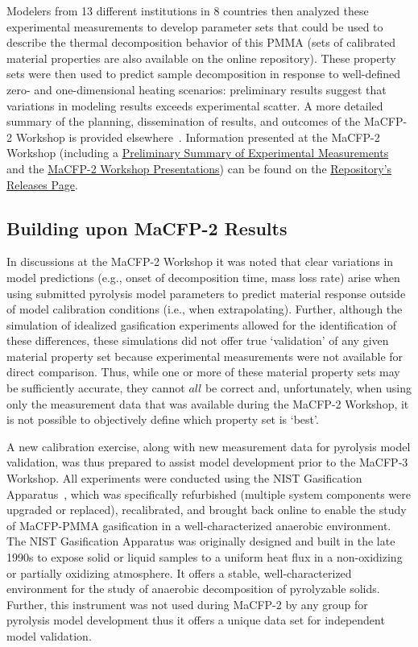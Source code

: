 \documentclass[12pt]{article}
\begin{document}
Modelers from 13 different institutions in 8 countries then analyzed these experimental measurements to develop parameter sets that could be used to describe the thermal decomposition behavior of this PMMA (sets of calibrated material properties are also available on the online repository). These property sets were then used to predict sample decomposition in response to well-defined zero- and one-dimensional heating scenarios: preliminary results suggest that variations in modeling results exceeds experimental scatter.  A more detailed summary of the planning, dissemination of results, and outcomes of the MaCFP-2 Workshop is provided elsewhere~\cite{Leventon2022ASTM}. Information presented at the MaCFP-2 Workshop (including a \href{https://github.com/MaCFP/matl-db/releases/tag/v1.0.0}{Preliminary Summary of Experimental Measurements}~\cite{PreliminarySummary} and the \href{https://github.com/MaCFP/matl-db/releases/tag/v1.1.0}{MaCFP-2 Workshop Presentations}) can be found on the \href{https://github.com/MaCFP/matl-db/releases}{Repository's Releases Page}.

\subsection{Building upon MaCFP-2 Results}
In discussions at the MaCFP-2 Workshop it was noted that clear variations in model predictions (e.g., onset of decomposition time, mass loss rate) arise when using submitted pyrolysis model parameters to predict material response outside of model calibration conditions (i.e., when extrapolating). Further, although the simulation of idealized gasification experiments allowed for the identification of these differences, these simulations did not offer true `validation' of any given material property set because experimental measurements were not available for direct comparison. Thus, while one or more of these material property sets may be sufficiently accurate, they cannot $all$ be correct and, unfortunately, when using only the measurement data that was available during the MaCFP-2 Workshop, it is not possible to objectively define which property set is `best'.

A new calibration exercise, along with new measurement data for pyrolysis model validation, was thus prepared to assist model development prior to the MaCFP-3 Workshop. All experiments were conducted using the NIST Gasification Apparatus~\cite{austin1998gasification}, which was specifically refurbished (multiple system components were upgraded or replaced), recalibrated, and brought back online to enable the study of MaCFP-PMMA gasification in a well-characterized anaerobic environment. The NIST Gasification Apparatus was originally designed and built in the late 1990s to expose solid or liquid samples to a uniform heat flux in a non-oxidizing or partially oxidizing atmosphere. It offers a stable, well-characterized environment for the study of anaerobic decomposition of pyrolyzable solids. Further, this instrument was not used during MaCFP-2 by any group for pyrolysis model development thus it offers a unique data set for independent model validation.
\end{document}
